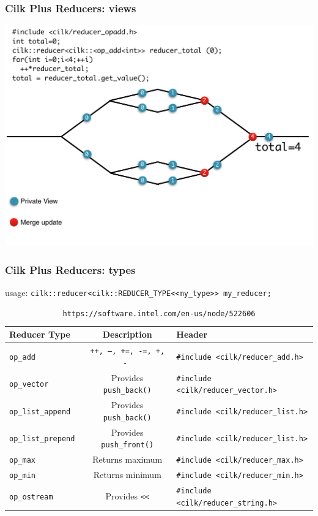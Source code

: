 \documentclass[fleqn,xcolor=table,10pt,final]{beamer}
\begin{document}
\begin{frame}
  \frametitle{Cilk Plus Reducers: views}
  \includegraphics[width=\textwidth]{figures/reduce}
\end{frame}

\begin{frame}[fragile]
  \frametitle{Cilk Plus Reducers: types}
    {\scriptsize
  usage: \verb|cilk::reducer<cilk::REDUCER_TYPE<<my_type>> my_reducer;|
  \begin{table}
    \begin{tabular}{l|c|l}
      Reducer Type & Description & Header\\
      \hline
      \tt{op\_add} & \tt{++, --, +=, -=, +, -} & \verb|#include <cilk/reducer_add.h>|\\
      \tt{op\_vector} & Provides \verb|push_back()|& \verb|#include <cilk/reducer_vector.h>|\\
      \tt{op\_list\_append} & Provides \verb|push_back()|& \verb|#include <cilk/reducer_list.h>|\\
      \tt{op\_list\_prepend} & Provides \verb|push_front()|& \verb|#include <cilk/reducer_list.h>|\\
      \tt{op\_max} & Returns maximum & \verb|#include <cilk/reducer_max.h>|\\
      \tt{op\_min} & Returns minimum & \verb|#include <cilk/reducer_min.h>|\\
      \tt{op\_ostream} & Provides \tt{<<}& \verb|#include <cilk/reducer_string.h>|
    \end{tabular}
    \caption{\tt{https://software.intel.com/en-us/node/522606}}
  \end{table}
}

\end{frame}
\end{document}
